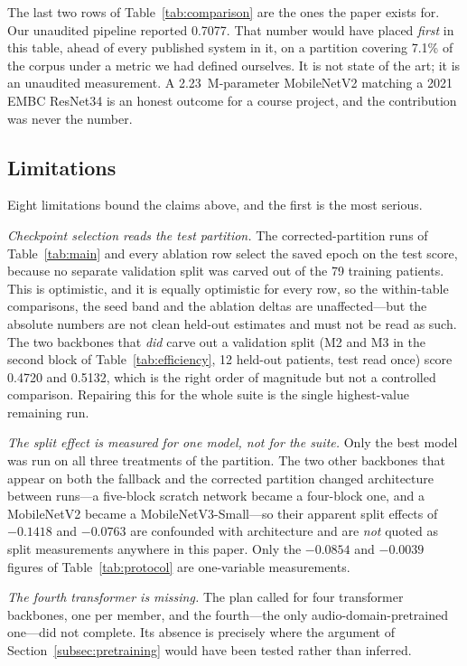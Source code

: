 \documentclass[journal,onecolumn]{IEEEtran}
\begin{document}
The last two rows of Table~\ref{tab:comparison} are the ones the paper exists for.
Our unaudited pipeline reported 0.7077. That number would have placed \emph{first}
in this table, ahead of every published system in it, on a partition covering 7.1\%
of the corpus under a metric we had defined ourselves. It is not state of the art;
it is an unaudited measurement. A 2.23~M-parameter MobileNetV2 matching a 2021
EMBC ResNet34 is an honest outcome for a course project, and the contribution was
never the number.

\subsection{Limitations}
\label{subsec:limitations}

Eight limitations bound the claims above, and the first is the most serious.

\emph{Checkpoint selection reads the test partition.} The corrected-partition runs
of Table~\ref{tab:main} and every ablation row select the saved epoch on the test
score, because no separate validation split was carved out of the 79 training
patients. This is optimistic, and it is equally optimistic for every row, so the
within-table comparisons, the seed band and the ablation deltas are unaffected---but
the absolute numbers are not clean held-out estimates and must not be read as
such. The two backbones that \emph{did} carve out a validation split (M2 and M3 in
the second block of Table~\ref{tab:efficiency}, 12 held-out patients, test read
once) score 0.4720 and 0.5132, which is the right order of magnitude but not a
controlled comparison. Repairing this for the whole suite is the single highest-value
remaining run.

\emph{The split effect is measured for one model, not for the suite.} Only the best
model was run on all three treatments of the partition. The two other backbones
that appear on both the fallback and the corrected partition changed architecture
between runs---a five-block scratch network became a four-block one, and a
MobileNetV2 became a MobileNetV3-Small---so their apparent split effects of
$-0.1418$ and $-0.0763$ are confounded with architecture and are \emph{not} quoted
as split measurements anywhere in this paper. Only the $-0.0854$ and $-0.0039$
figures of Table~\ref{tab:protocol} are one-variable measurements.

\emph{The fourth transformer is missing.} The plan called for four transformer
backbones, one per member, and the fourth---the only audio-domain-pretrained
one---did not complete. Its absence is precisely where the argument of
Section~\ref{subsec:pretraining} would have been tested rather than inferred.
\end{document}
